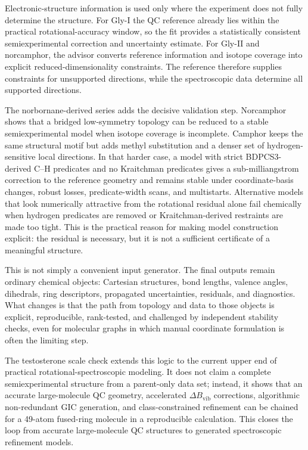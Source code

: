 \documentclass[aip,jcp,reprint,longbibliography,floatfix]{revtex4-2}
\begin{document}
Electronic-structure information is used only where the experiment does not
fully determine the structure. For Gly-I the QC reference already lies within
the practical rotational-accuracy window, so the fit provides a statistically
consistent semiexperimental correction and uncertainty estimate. For Gly-II
and norcamphor, the advisor converts reference information and isotope
coverage into explicit reduced-dimensionality constraints. The reference
therefore supplies constraints for unsupported directions, while the
spectroscopic data determine all supported directions.

The norbornane-derived series adds the decisive validation step. Norcamphor
shows that a bridged low-symmetry topology can be reduced to a stable
semiexperimental model when isotope coverage is incomplete. Camphor keeps the
same structural motif but adds methyl substitution and a denser set of
hydrogen-sensitive local directions. In that harder case, a model with strict
BDPCS3-derived C--H predicates and no Kraitchman predicates gives a
sub-milliangstrom correction to the reference geometry and remains stable
under coordinate-basis changes, robust losses, predicate-width scans, and
multistarts. Alternative models that look numerically attractive from the
rotational residual alone fail chemically when hydrogen predicates are removed
or Kraitchman-derived restraints are made too tight. This is the practical
reason for making model construction explicit: the residual is necessary, but
it is not a sufficient certificate of a meaningful structure.

This is not simply a convenient input generator. The final outputs remain
ordinary chemical objects: Cartesian structures, bond lengths, valence angles,
dihedrals, ring descriptors, propagated uncertainties, residuals, and
diagnostics. What changes is that the path from topology and data to those
objects is explicit, reproducible, rank-tested, and challenged by independent
stability checks, even for molecular graphs in which manual coordinate
formulation is often the limiting step.

The testosterone scale check extends this logic to the current upper end of
practical rotational-spectroscopic modeling. It does not claim a complete
semiexperimental structure from a parent-only data set; instead, it shows that
an accurate large-molecule QC geometry, accelerated $\Delta B_\mathrm{vib}$
corrections, algorithmic non-redundant GIC generation, and class-constrained
refinement can be chained for a 49-atom fused-ring molecule in a
reproducible calculation. This closes the loop from accurate
large-molecule QC structures to generated spectroscopic
refinement models.
\end{document}
